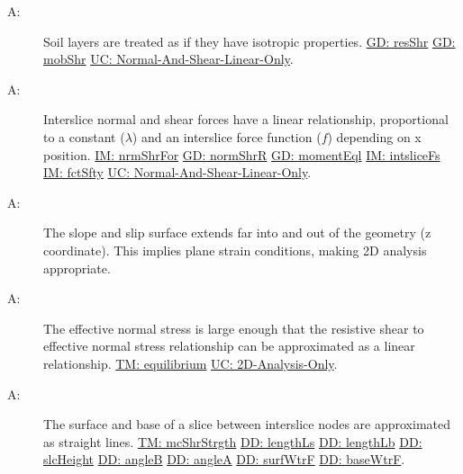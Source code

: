 \documentclass[12pt]{article}
\newcounter{assumpnum}
\newcommand{\atheassumpnum}{A\theassumpnum}
\begin{document}
\begin{description}
\item[\atheassumpnum\label{A:Soil-Layers-Isotropic}:]Soil layers are treated as if they have isotropic properties. \hyperref[GD:resShr]{GD: resShr} \hyperref[GD:mobShr]{GD: mobShr} \hyperref[UC_normshearlinear]{UC: Normal-And-Shear-Linear-Only}.
\end{description}
\begin{description}
\item[\atheassumpnum\label{A:Interslice-Norm-Shear-Forces-Linear}:]Interslice normal and shear forces have a linear relationship, proportional to a constant ($λ$) and an interslice force function ($f$) depending on x position. \hyperref[IM:nrmShrFor]{IM: nrmShrFor} \hyperref[GD:normShrR]{GD: normShrR} \hyperref[GD:momentEql]{GD: momentEql} \hyperref[IM:intsliceFs]{IM: intsliceFs} \hyperref[IM:fctSfty]{IM: fctSfty} \hyperref[UC_normshearlinear]{UC: Normal-And-Shear-Linear-Only}.
\end{description}
\begin{description}
\item[\atheassumpnum\label{A:Plane-Strain-Conditions}:]The slope and slip surface extends far into and out of the geometry (z coordinate). This implies plane strain conditions, making 2D analysis appropriate.
\end{description}
\begin{description}
\item[\atheassumpnum\label{A:Effective-Norm-Stress-Large}:]The effective normal stress is large enough that the resistive shear to effective normal stress relationship can be approximated as a linear relationship. \hyperref[TM:equilibrium]{TM: equilibrium} \hyperref[UC_2donly]{UC: 2D-Analysis-Only}.
\end{description}
\begin{description}
\item[\atheassumpnum\label{A:Surface-Base-Slice-between-Interslice-Straight-Lines}:]The surface and base of a slice between interslice nodes are approximated as straight lines. \hyperref[TM:mcShrStrgth]{TM: mcShrStrgth} \hyperref[DD:lengthLs]{DD: lengthLs} \hyperref[DD:lengthLb]{DD: lengthLb} \hyperref[DD:slcHeight]{DD: slcHeight} \hyperref[DD:angleB]{DD: angleB} \hyperref[DD:angleA]{DD: angleA} \hyperref[DD:surfWtrF]{DD: surfWtrF} \hyperref[DD:baseWtrF]{DD: baseWtrF}.
\end{description}
\end{document}
